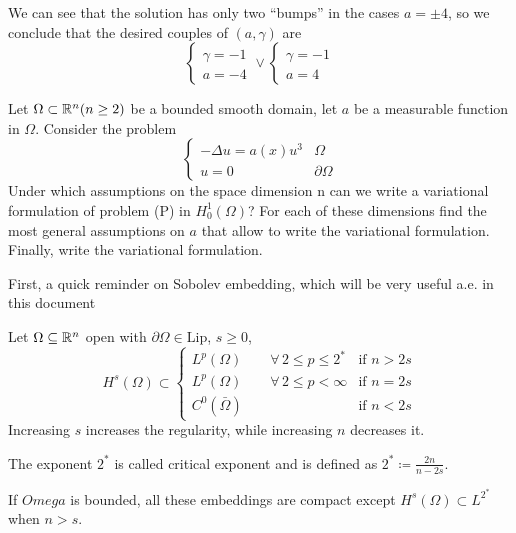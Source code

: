 We can see that the solution has only two ``bumps'' in the cases \(a = \pm 4\), so we conclude that the desired couples of \((a, \gamma)\) are 
\[
    \begin{cases}
        \gamma = -1\\
        a = -4
    \end{cases}
    \vee
    \begin{cases}
        \gamma = -1 \\ 
        a = 4
    \end{cases}
\]
\newpage
\begin{exercise}
Let \(\Omega \subset \mathbb{R}^n (n \geq 2)\) be a bounded smooth domain, let \(a\) be a measurable function in \(\Omega\).
Consider the problem
\[
    \begin{cases}
        - \Delta u = a(x) u^3 & \Omega \\
        u = 0 & \partial\Omega
    \end{cases}
    \tag*{(P)}
\]
Under which assumptions on the space dimension n can we write a variational formulation of problem (P) in
\(H^1_0(\Omega)\)? For each of these dimensions find the most general assumptions on \(a\) that allow to write the variational formulation. Finally, write the variational formulation.
\end{exercise}

First, a quick reminder on Sobolev embedding, which will be very useful a.e. in this document
\begin{remark}\label{sobolev_embedding}
    Let \(\Omega \subseteq \mathbb{R}^n\) open with \(\partial\Omega \in \text{Lip}\), \(s \geq 0\),
    \[
        H^s(\Omega) \subset 
        \begin{cases}
            L^p(\Omega) \qquad \forall \, 2 \leq p \leq 2^* & \text{if } n > 2s \\
            L^p(\Omega) \qquad \forall \, 2 \leq p < \infty & \text{if } n = 2s \\
            C^0(\bar{\Omega})  & \text{if } n < 2s
        \end{cases}
    \]
    Increasing \(s\) increases the regularity, while increasing \(n\) decreases it.

    The exponent \(2^*\) is called critical exponent and is defined as \(2^* \coloneqq \frac{2n}{n - 2s}\).

    If \(Omega\) is bounded, all these embeddings are compact except \(H^s(\Omega) \subset L^{2^*}\) when \(n > s\).
\end{remark}

